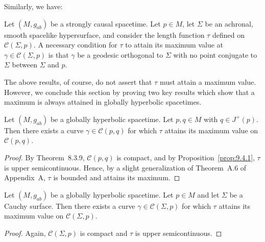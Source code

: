 Similarly, we have:

\begin{theorem}\label{thm:9.4.3}
Let \((M,g_{ab})\) be a strongly causal spacetime. Let \(p\in M\), let \(\Sigma\) be
an achronal, smooth spacelike hypersurface, and consider the length function \(\tau\)
defined on \(\mathcal C(\Sigma,p)\). A necessary condition for \(\tau\) to attain its
maximum value at \(\gamma\in\mathcal C(\Sigma,p)\) is that \(\gamma\) be a geodesic
orthogonal to \(\Sigma\) with no point conjugate to \(\Sigma\) between \(\Sigma\) and
\(p\).
\end{theorem}

The above results, of course, do not assert that \(\tau\) must attain a maximum
value. However, we conclude this section by proving two key results which show that a
maximum is always attained in globally hyperbolic spacetimes.

\begin{theorem}\label{thm:9.4.4}
Let \((M,g_{ab})\) be a globally hyperbolic spacetime. Let \(p,q\in M\) with
\(q\in J^+(p)\). Then there exists a curve \(\gamma\in\mathcal C(p,q)\) for which
\(\tau\) attains its maximum value on \(\mathcal C(p,q)\).
\end{theorem}

\begin{proof}
By Theorem~8.3.9, \(\mathcal C(p,q)\) is compact, and by
Proposition~\ref{prop:9.4.1}, \(\tau\) is upper semicontinuous. Hence, by a slight
generalization of Theorem~A.6 of Appendix~A, \(\tau\) is bounded and attains its
maximum.
\end{proof}

\begin{theorem}\label{thm:9.4.5}
Let \((M,g_{ab})\) be a globally hyperbolic spacetime. Let \(p\in M\) and let
\(\Sigma\) be a Cauchy surface. Then there exists a curve
\(\gamma\in\mathcal C(\Sigma,p)\) for which \(\tau\) attains its maximum value on
\(\mathcal C(\Sigma,p)\).
\end{theorem}

\begin{proof}
Again, \(\mathcal C(\Sigma,p)\) is compact and \(\tau\) is upper semicontinuous.
\end{proof}
